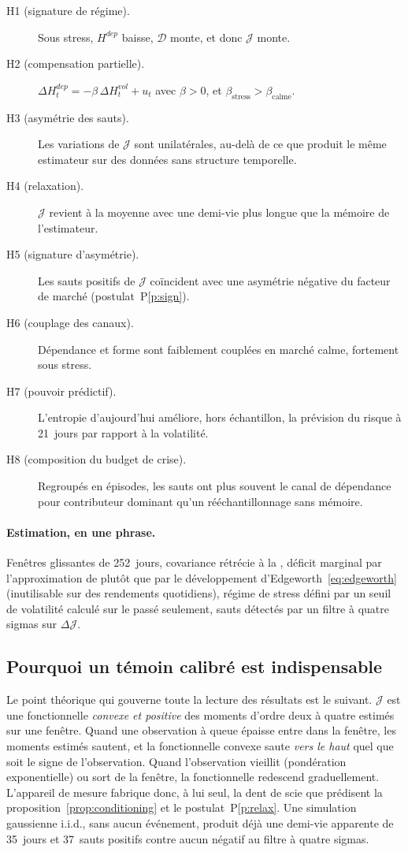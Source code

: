 \documentclass[11pt]{article}
\theoremstyle{definition}
\theoremstyle{remark}
\newcommand{\JJ}{\mathcal{J}}
\newcommand{\DD}{\mathcal{D}}
\begin{document}
\begin{description}
\item[H1 (signature de régime).] Sous stress, $H^{dep}$ baisse, $\DD$ monte, et
donc $\JJ$ monte.
\item[H2 (compensation partielle).] $\Delta H^{dep}_t=-\beta\,\Delta H^{vol}_t+u_t$
avec $\beta>0$, et $\beta_{\text{stress}}>\beta_{\text{calme}}$.
\item[H3 (asymétrie des sauts).] Les variations de $\JJ$ sont unilatérales,
au-delà de ce que produit le même estimateur sur des données sans structure
temporelle.
\item[H4 (relaxation).] $\JJ$ revient à la moyenne avec une demi-vie plus longue
que la mémoire de l'estimateur.
\item[H5 (signature d'asymétrie).] Les sauts positifs de $\JJ$ coïncident avec
une asymétrie négative du facteur de marché (postulat~P\ref{p:sign}).
\item[H6 (couplage des canaux).] Dépendance et forme sont faiblement couplées en
marché calme, fortement sous stress.
\item[H7 (pouvoir prédictif).] L'entropie d'aujourd'hui améliore, hors
échantillon, la prévision du risque à 21~jours par rapport à la volatilité.
\item[H8 (composition du budget de crise).] Regroupés en épisodes, les sauts ont
plus souvent le canal de dépendance pour contributeur dominant qu'un
rééchantillonnage sans mémoire.
\end{description}

\paragraph{Estimation, en une phrase.} Fenêtres glissantes de 252~jours,
covariance rétrécie à la \citet{ledoit2004}, déficit marginal par
l'approximation de \citet{hyvarinen1998} plutôt que par le développement
d'Edgeworth~\eqref{eq:edgeworth} (inutilisable sur des rendements quotidiens),
régime de stress défini par un seuil de volatilité calculé sur le passé
seulement, sauts détectés par un filtre à quatre sigmas sur $\Delta\JJ$.

\subsection{Pourquoi un témoin calibré est indispensable}

Le point théorique qui gouverne toute la lecture des résultats est le suivant.
$\JJ$ est une fonctionnelle \emph{convexe et positive} des moments d'ordre deux à
quatre estimés sur une fenêtre. Quand une observation à queue épaisse entre dans
la fenêtre, les moments estimés sautent, et la fonctionnelle convexe saute
\emph{vers le haut} quel que soit le signe de l'observation. Quand
l'observation vieillit (pondération exponentielle) ou sort de la fenêtre, la
fonctionnelle redescend graduellement. L'appareil de mesure fabrique donc, à
lui seul, la dent de scie que prédisent la proposition~\ref{prop:conditioning}
et le postulat~P\ref{p:relax}. Une simulation gaussienne i.i.d., sans aucun
événement, produit déjà une demi-vie apparente de 35~jours et 37~sauts positifs
contre aucun négatif au filtre à quatre sigmas.
\end{document}

